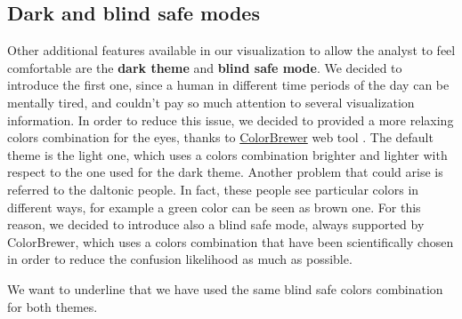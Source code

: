 \subsection{Dark and blind safe modes}
Other additional features available in our visualization to allow the analyst to feel comfortable are the \textbf{dark theme} and \textbf{blind safe mode}. We decided to introduce the first one, since a human in different time periods of the day can be mentally tired, and couldn't pay so much attention to several visualization information. In order to reduce this issue, we decided to provided a more relaxing colors combination for the eyes, thanks to \href{https://colorbrewer2.org/}{ColorBrewer} web tool \cite{HB03}. The default theme is the light one, which uses a colors combination brighter and lighter with respect to the one used for the dark theme. Another problem that could arise is referred to the daltonic people. In fact, these people see particular colors in different ways, for example a green color can be seen as brown one. For this reason, we decided to introduce also a blind safe mode, always supported by ColorBrewer, which uses a colors combination that have been scientifically chosen in order to reduce the confusion likelihood as much as possible.

We want to underline that we have used the same blind safe colors combination for both themes.